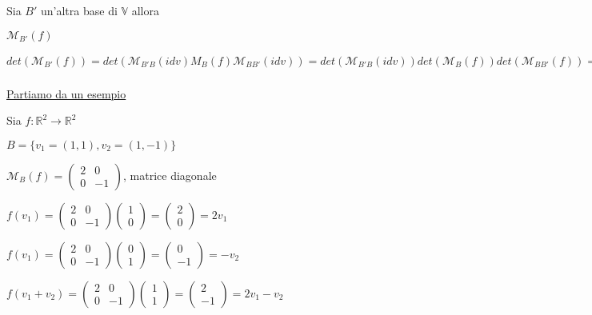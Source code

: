 \documentclass{article}
\newcommand{\hl}[1]{\colorbox{yellow}{#1}}
\newcommand{\ul}[1]{\underline{#1}}
\newcommand{\R}{\mathbb{R}}
\newcommand{\V}{\mathbb{V}}
\newcommand{\M}{\mathcal{M}}
\begin{document}
	Sia $B'$ un'altra base di $\V$ allora

$\M_{B'}(f)$


$det(\M_{B'}(f))=det(\M_{B'B}(idv)M_B(f)\M_{BB'}(idv))=det(\M_{B'B}(idv))det(\M_B(f))det(\M_{BB'}(f))=\frac{1}{\bar{det(\M_{BB'}(idv))}}\cdot det(\M_B(f))\cdot\bar{det(\M_{BB'}(idv))}$

	\ul{Partiamo da un esempio}

	Sia $f:\R^2\rightarrow\R^2$

$B=\{v_1=(1,1),v_2=(1,-1)\}$

$\M_B(f)=\begin{pmatrix}2&0\\0&-1\end{pmatrix}$, matrice diagonale

$f(v_1)=\begin{pmatrix}2&0\\0&-1\end{pmatrix}\begin{pmatrix}1\\0\end{pmatrix}=\begin{pmatrix}2\\0\end{pmatrix}=2v_1$

$f(v_1)=\begin{pmatrix}2&0\\0&-1\end{pmatrix}\begin{pmatrix}0\\1\end{pmatrix}=\begin{pmatrix}0\\-1\end{pmatrix}=-v_2$

$f(v_1+v_2)=\begin{pmatrix}2&0\\0&-1\end{pmatrix}\begin{pmatrix}1\\1\end{pmatrix}=\begin{pmatrix}2\\-1\end{pmatrix}=2v_1-v_2$
\end{document}
